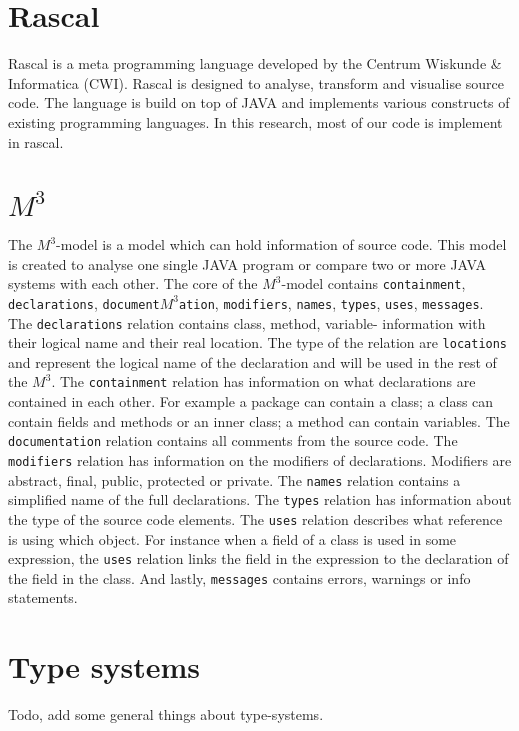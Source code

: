 \documentclass[../main.tex]{subfiles}
\begin{document}
    \section{Rascal}
    \Gls{Rascal} is a meta programming language developed by the Centrum Wiskunde \& Informatica (CWI)\cite{Kli:09}.
    Rascal is designed to analyse, transform and visualise source code.
    The language is build on top of JAVA and implements various constructs of existing programming languages.
    In this research, most of our code is implement in rascal.

    \section{$M^3$}
    The $M^3$-model is a model which can hold information of source code\cite{Ana:13}.
    This model is created to analyse one single JAVA program or compare two or more JAVA systems with each other.
    The core of the $M^3$-model contains \texttt{containment}, \texttt{declarations}, \texttt{document$M^3$ation}, \texttt{modifiers}, \texttt{names}, \texttt{types}, \texttt{uses}, \texttt{messages}.
    \\
    The \texttt{declarations} relation contains class, method, variable- information with their logical name and their real location. The type of the relation are \texttt{locations} and represent the logical name of the declaration and will be used in the rest of the $M^3$.
    The \texttt{containment} relation has information on what declarations are contained in each other. For example a package can contain a class; a class can contain fields and methods or an inner class; a method can contain variables.    
    The \texttt{documentation} relation contains all comments from the source code. 
    The \texttt{modifiers} relation has information on the modifiers of declarations. Modifiers are abstract, final, public, protected or private.
    The \texttt{names} relation contains a simplified name of the full declarations.
    The \texttt{types} relation has information about the type of the source code elements.
    The \texttt{uses} relation describes what reference is using which object. For instance when a field of a class is used in some expression, the \texttt{uses} relation links the field in the expression to the declaration of the field in the class.
    And lastly, \texttt{messages} contains errors, warnings or info statements.
    
    \section{Type systems}
    Todo, add some general things about type-systems.
    
\end{document}
